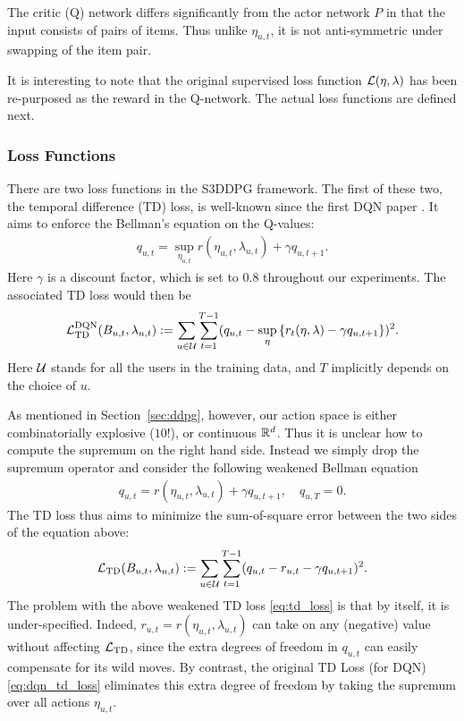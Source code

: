 The critic (Q) network differs significantly from the actor network $P$ in that the input consists of pairs of items. Thus unlike $\eta_{u, t}$, it is not anti-symmetric under swapping of the item pair.


It is interesting to note that the original supervised loss function $\mathcal{L}(\eta, \lambda)$ has been re-purposed as the reward in the Q-network. The actual loss functions are defined next.

\subsubsection{Loss Functions}
There are two loss functions in the S3DDPG framework. The first of these two, the temporal difference (TD) loss, is well-known since the first DQN paper \cite{mnih2013playing}. It aims to enforce the Bellman's equation on the Q-values:
\begin{align} \label{eq:bellman}
    q_{u, t} = \sup_{\eta_{u, t}} r(\eta_{u, t}, \lambda_{u, t}) + \gamma q_{u, t + 1}.
\end{align}
Here $\gamma$ is a discount factor, which is set to $0.8$ throughout our experiments. The associated TD loss would then be
\begin{align} \label{eq:dqn_td_loss}
    \mathcal{L}^{\text{DQN}}_{\text{TD}} (B_{u, t}, \lambda_{u, t}) := \sum_{u \in \mathcal{U}} \sum_{t=1}^{T - 1} (q_{u, t} - \sup_\eta \left\{r_t(\eta, \lambda) - \gamma q_{u, t+1}\right\})^2.
\end{align}
Here $\mathcal{U}$ stands for all the users in the training data, and $T$ implicitly depends on the choice of $u$. 

As mentioned in Section~\ref{sec:ddpg}, however, our action space is either combinatorially explosive ($10!$), or continuous $\mathbb{R}^d$. Thus it is unclear how to compute the supremum on the right hand side. Instead we simply drop the supremum operator and consider the following weakened Bellman equation
\begin{align} \label{eq:weak_bellman}
    q_{u, t} = r(\eta_{u, t}, \lambda_{u, t}) + \gamma q_{u, t + 1}, \quad q_{u, T} = 0.
\end{align}
The TD loss thus aims to minimize the sum-of-square error between the two sides of the equation above:
\begin{align} \label{eq:td_loss}
    \mathcal{L}_{\text{TD}}(B_{u, t}, \lambda_{u, t}) := \sum_{u \in \mathcal{U}} \sum_{t=1}^{T - 1} (q_{u, t} - r_{u, t} - \gamma q_{u, t + 1})^2.
\end{align}
The problem with the above weakened TD loss \eqref{eq:td_loss} is that by itself, it is under-specified. Indeed, $r_{u, t} = r(\eta_{u, t}, \lambda_{u, t})$ can take on any (negative) value without affecting $\mathcal{L}_{\text{TD}}$, since the extra degrees of freedom in $q_{u, t}$ can easily compensate for its wild moves. By contrast, the original TD Loss (for DQN) \eqref{eq:dqn_td_loss} eliminates this extra degree of freedom by taking the supremum over all actions $\eta_{u, t}$. 

